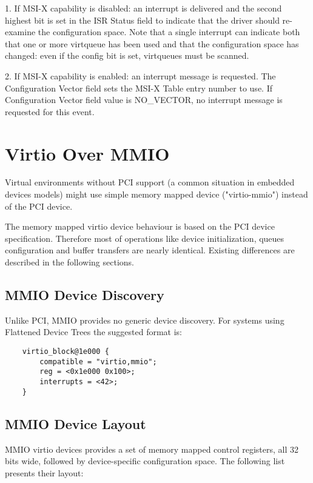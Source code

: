 1. If MSI-X capability is disabled: an interrupt is delivered and
  the second highest bit is set in the ISR Status field to
  indicate that the driver should re-examine the configuration
  space.  Note that a single interrupt can indicate both that one
  or more virtqueue has been used and that the configuration
  space has changed: even if the config bit is set, virtqueues
  must be scanned.

2. If MSI-X capability is enabled: an interrupt message is
  requested. The Configuration Vector field sets the MSI-X Table
  entry number to use. If Configuration Vector field value is
  NO_VECTOR, no interrupt message is requested for this event.

\section{Virtio Over MMIO}\label{sec:Virtio Transport Options / Virtio Over MMIO}

Virtual environments without PCI support (a common situation in
embedded devices models) might use simple memory mapped device
("virtio-mmio") instead of the PCI device.

The memory mapped virtio device behaviour is based on the PCI
device specification. Therefore most of operations like device
initialization, queues configuration and buffer transfers are
nearly identical. Existing differences are described in the
following sections.

\subsection{MMIO Device Discovery}\label{sec:Virtio Transport Options / Virtio Over MMIO / MMIO Device Discovery}

Unlike PCI, MMIO provides no generic device discovery. For
systems using Flattened Device Trees the suggested format is:

\begin{lstlisting}
	virtio_block@1e000 {
		compatible = "virtio,mmio";
		reg = <0x1e000 0x100>;
		interrupts = <42>;
	}
\end{lstlisting}

\subsection{MMIO Device Layout}\label{sec:Virtio Transport Options / Virtio Over MMIO / MMIO Device Layout}

MMIO virtio devices provides a set of memory mapped control
registers, all 32 bits wide, followed by device-specific
configuration space. The following list presents their layout:

